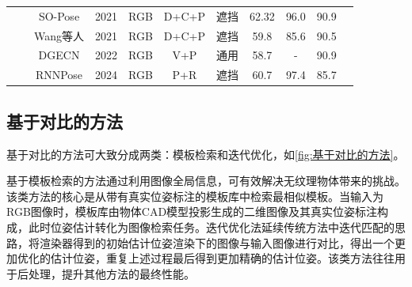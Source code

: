 \begin{table}[!t]
{\begin{tabular}{|ccc|c|c|c|c|c|c|c|c|}
    \multicolumn{1}{|c|}{} & \multicolumn{1}{l|}{} & SO-Pose\cite{Di_2021_ICCV} & 2021 & RGB & D+C+P & 遮挡 & \multicolumn{1}{c|}{62.32} & 96.0 & 90.9 \\
    \cline{3-10}

    \multicolumn{1}{|c|}{} & \multicolumn{1}{l|}{}& Wang等人\cite{wang2021occlusion} & 2021 & RGB & D+C+P & 遮挡 & \multicolumn{1}{c|}{59.8} & 85.6 & 90.5 \\
    \cline{3-10}

    \multicolumn{1}{|c|}{} &\multicolumn{1}{l|}{}& DGECN\cite{cao2022dgecn} & 2022 & RGB & V+P & 通用 & \multicolumn{1}{c|}{58.7} & - & 90.9 \\
    \cline{3-10}
    
    \multicolumn{1}{|c|}{} & \multicolumn{1}{l|}{} & RNNPose\cite{Xu2024RNNPose} & 2024 & RGB & P+R & 遮挡 & \multicolumn{1}{c|}{60.7} & 97.4 & 85.7 \\

    \hline
    \end{tabular}%
    }
    \label{tab:回归方法}
    \vspace{-1em}
\end{table}

\subsection{基于对比的方法}\label{基于对比的方法}

\par 基于对比的方法可大致分成两类：模板检索和迭代优化，如\autoref{fig:基于对比的方法}。

\par 基于模板检索的方法通过利用图像全局信息，可有效解决无纹理物体带来的挑战。该类方法的核心是从带有真实位姿标注的模板库中检索最相似模板。当输入为RGB图像时，模板库由物体CAD模型投影生成的二维图像及其真实位姿标注构成，此时位姿估计转化为图像检索任务。迭代优化法延续传统方法中迭代匹配的思路，将渲染器得到的初始估计位姿渲染下的图像与输入图像进行对比，得出一个更加优化的估计位姿，重复上述过程最后得到更加精确的估计位姿。该类方法往往用于后处理，提升其他方法的最终性能。

